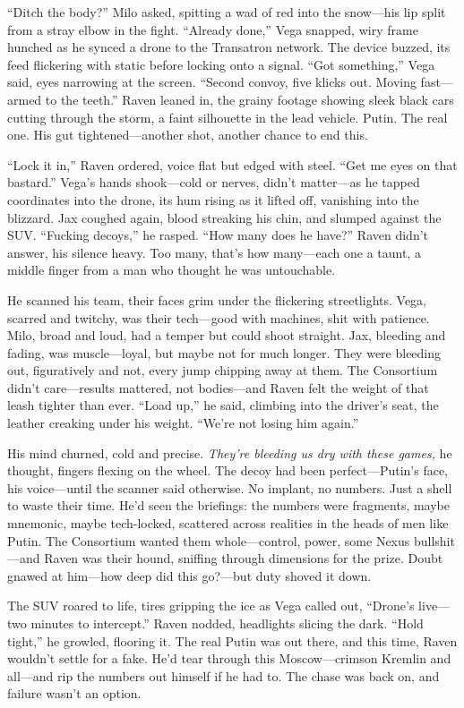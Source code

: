 \documentclass[12pt]{book}
\begin{document}
“Ditch the body?” Milo asked, spitting a wad of red into the snow—his lip split from a stray elbow in the fight. “Already done,” Vega snapped, wiry frame hunched as he synced a drone to the Transatron network. The device buzzed, its feed flickering with static before locking onto a signal. “Got something,” Vega said, eyes narrowing at the screen. “Second convoy, five klicks out. Moving fast—armed to the teeth.” Raven leaned in, the grainy footage showing sleek black cars cutting through the storm, a faint silhouette in the lead vehicle. Putin. The real one. His gut tightened—another shot, another chance to end this.

“Lock it in,” Raven ordered, voice flat but edged with steel. “Get me eyes on that bastard.” Vega’s hands shook—cold or nerves, didn’t matter—as he tapped coordinates into the drone, its hum rising as it lifted off, vanishing into the blizzard. Jax coughed again, blood streaking his chin, and slumped against the SUV. “Fucking decoys,” he rasped. “How many does he have?” Raven didn’t answer, his silence heavy. Too many, that’s how many—each one a taunt, a middle finger from a man who thought he was untouchable.

He scanned his team, their faces grim under the flickering streetlights. Vega, scarred and twitchy, was their tech—good with machines, shit with patience. Milo, broad and loud, had a temper but could shoot straight. Jax, bleeding and fading, was muscle—loyal, but maybe not for much longer. They were bleeding out, figuratively and not, every jump chipping away at them. The Consortium didn’t care—results mattered, not bodies—and Raven felt the weight of that leash tighter than ever. “Load up,” he said, climbing into the driver’s seat, the leather creaking under his weight. “We’re not losing him again.”

His mind churned, cold and precise. \textit{They’re bleeding us dry with these games,} he thought, fingers flexing on the wheel. The decoy had been perfect—Putin’s face, his voice—until the scanner said otherwise. No implant, no numbers. Just a shell to waste their time. He’d seen the briefings: the numbers were fragments, maybe mnemonic, maybe tech-locked, scattered across realities in the heads of men like Putin. The Consortium wanted them whole—control, power, some Nexus bullshit—and Raven was their hound, sniffing through dimensions for the prize. Doubt gnawed at him—how deep did this go?—but duty shoved it down.

The SUV roared to life, tires gripping the ice as Vega called out, “Drone’s live—two minutes to intercept.” Raven nodded, headlights slicing the dark. “Hold tight,” he growled, flooring it. The real Putin was out there, and this time, Raven wouldn’t settle for a fake. He’d tear through this Moscow—crimson Kremlin and all—and rip the numbers out himself if he had to. The chase was back on, and failure wasn’t an option.
\end{document}
